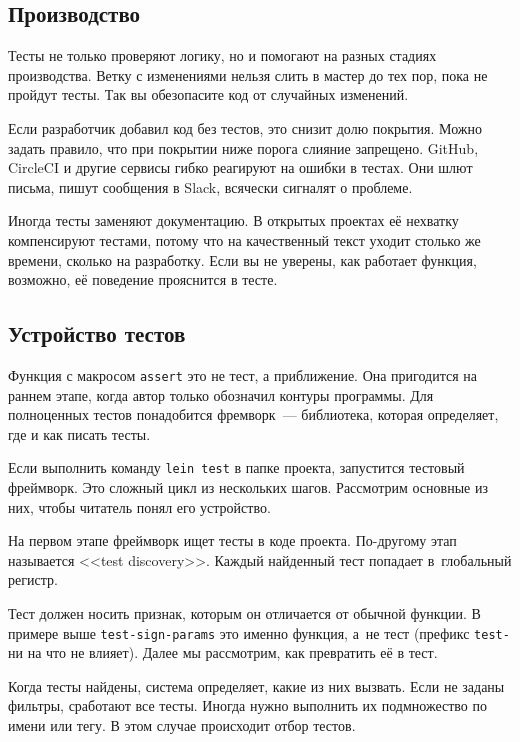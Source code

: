 \subsection{Производство}


Тесты не только проверяют логику, но и помогают на разных стадиях
производства. Ветку с изменениями нельзя слить в мастер до тех пор, пока не
пройдут тесты. Так вы обезопасите код от случайных изменений.

Если разработчик добавил код без тестов, это снизит долю покрытия. Можно задать
правило, что при покрытии ниже порога слияние запрещено. GitHub, CircleCI и
другие сервисы гибко реагируют на ошибки в тестах. Они шлют письма, пишут
сообщения в Slack, всячески сигналят о проблеме.

Иногда тесты заменяют документацию. В открытых проектах её нехватку
компенсируют тестами, потому что на качественный текст уходит столько же
времени, сколько на разработку. Если вы не уверены, как работает функция,
возможно, её поведение прояснится в тесте.

\subsection{Устройство тестов}


Функция с макросом \verb|assert| это не тест, а приближение. Она пригодится на
раннем этапе, когда автор только обозначил контуры программы. Для полноценных
тестов понадобится фремворк~--- библиотека, которая определяет, где и как писать
тесты.

Если выполнить команду \verb|lein test| в папке проекта, запустится тестовый
фреймворк. Это сложный цикл из нескольких шагов. Рассмотрим основные из них,
чтобы читатель понял его устройство.

На первом этапе фреймворк ищет тесты в коде проекта. По-другому этап называется
<<test discovery>>. Каждый найденный тест попадает в~глобальный регистр.

Тест должен носить признак, которым он отличается от обычной функции. В примере
выше \verb|test-sign-params| это именно функция, а~не тест (префикс \verb|test-|
ни на что не влияет). Далее мы рассмотрим, как превратить её в тест.

Когда тесты найдены, система определяет, какие из них вызвать. Если не заданы
фильтры, сработают все тесты. Иногда нужно выполнить их подмножество по имени
или тегу. В этом случае происходит отбор тестов.

